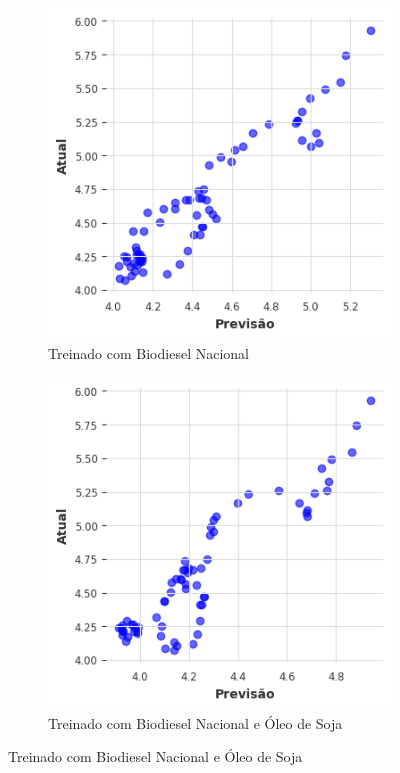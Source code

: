 \begin{figure}[htbp]
	\centering
	\begin{subfigure}[b]{0.40\textwidth}
		\centering
		\includegraphics[width=\textwidth]{figuras/nhits_brasil_scatter.png} %
		\caption{Treinado com Biodiesel Nacional \newline}
		\label{fig:nhits_brasil_scatter}
	\end{subfigure}
	\hfill
	\begin{subfigure}[b]{0.40\textwidth}
		\centering
		\includegraphics[width=\textwidth]{figuras/nhits_brasil_oil_scatter.png} %
		\caption{Treinado com Biodiesel Nacional e Óleo de Soja}
		\label{fig:nhits_brasil_oil_scatter}
	\end{subfigure}


\end{figure}
